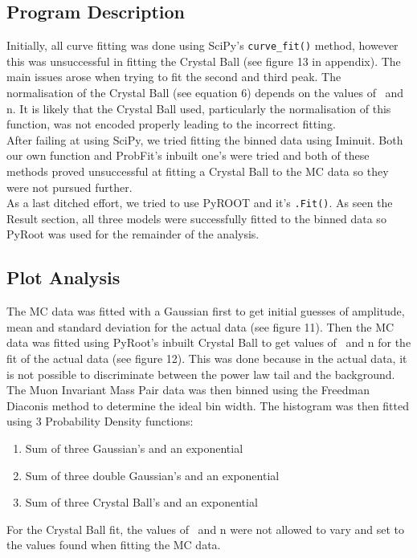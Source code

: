 \subsection*{Program Description}
Initially, all curve fitting was done using SciPy's \verb|curve_fit()| method, however this was unsuccessful in fitting the Crystal Ball (see figure 13 in appendix). The main issues arose when trying to fit the second and third peak. The normalisation of the Crystal Ball (see equation 6) depends on the values of \textalpha\ and n. It is likely that the Crystal Ball used, particularly the normalisation of this function, was not encoded properly leading to the incorrect fitting. \\

After failing at using SciPy, we tried fitting the binned data using Iminuit. Both our own function and ProbFit's inbuilt one's were tried and both of these methods proved unsuccessful at fitting a Crystal Ball to the MC data so they were not pursued further.\\

As a last ditched effort, we tried to use PyROOT and it's \verb|.Fit()|. As seen the Result section, all three models were successfully fitted to the binned data so PyRoot was used for the remainder of the analysis.\\

\subsection*{Plot Analysis}
The MC data was fitted with a Gaussian first to get initial guesses of amplitude, mean and standard deviation for the actual data (see figure 11). Then the MC data was fitted using PyRoot's inbuilt Crystal Ball to get values of \textalpha\ and n for the fit of the actual data (see figure 12). This was done because in the actual data, it is not possible to discriminate between the power law tail and the background. \\

The Muon Invariant Mass Pair data was then binned using the Freedman Diaconis method to determine the ideal bin width. The histogram was then fitted using 3 Probability Density functions:
\begin{enumerate}
    \item Sum of three Gaussian's and an exponential
    \item Sum of three double Gaussian's and an exponential
    \item Sum of three Crystal Ball's and an exponential
\end{enumerate}
For the Crystal Ball fit, the values of \textalpha\ and n were not allowed to vary and set to the values found when fitting the MC data.\\

